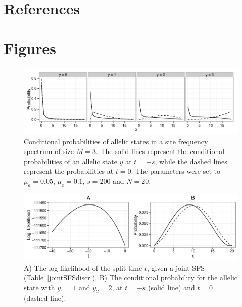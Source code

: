 \documentclass[preprint]{elsarticle}
\begin{document}
\section*{References}



\newpage

\section*{Figures}

\begin{figure}[ht]
\includegraphics[width = 12cm]{cProb.pdf}
\caption{Conditional probabilities of allelic states in a site frequency spectrum of size $M=3$. The solid lines represent the conditional probabilities of an allelic state $y$ at $t=-s$, while the dashed lines represent the probabilities at $t=0$. The parameters were set to $\mu_a=0.05$, $\mu_c=0.1$, $s=200$ and $N=20$.}\label{cProb}
\end{figure}

\begin{figure}[ht]
\includegraphics[width = 12cm]{twoPop_14_7_2016.pdf}
\caption{A) The log-likelihood of the split time $t$, given a joint SFS (Table~\ref{jointSFSdiscr}). B) The conditional probability for the allelic state with $y_1=1$ and $y_2=2$, at $t=-s$ (solid line) and $t=0$ (dashed line).}\label{twoPopdiscr}
\end{figure}
\end{document}
